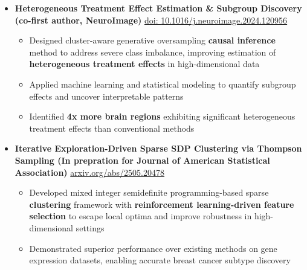 \documentclass[letterpaper,11pt]{article}
\begin{document}
\begin{itemize}[leftmargin=0in, label={}]
\begin{itemize}[leftmargin=0.14in]
\end{itemize}
\vspace{-11.5pt}
\item
\textbf{Heterogeneous Treatment Effect Estimation \& Subgroup Discovery (co-first author, NeuroImage)} \href{https://doi.org/10.1016/j.neuroimage.2024.120956}{doi: \url{10.1016/j.neuroimage.2024.120956}}
\\
\vspace{-5.55pt}
\begin{itemize}[leftmargin=0.14in]
	\item \small
	Designed  cluster-aware generative oversampling \textbf{causal inference} method to address severe class imbalance, improving estimation of \textbf{heterogeneous treatment effects} in high-dimensional data
	\vspace{-1.5pt}
	\item \small %
	Applied machine learning and statistical modeling to quantify subgroup effects and uncover interpretable patterns
	\vspace{-1.5pt}
	\item \small %
	Identified \textbf{4x more brain regions} exhibiting significant heterogeneous treatment effects than conventional methods
\end{itemize}
\vspace{-11.5pt}
\item
\textbf{Iterative Exploration-Driven Sparse SDP Clustering via Thompson Sampling (In prepration for Journal of American Statistical Association)} \href{https://arxiv.org/abs/2505.20478}{arxiv.org/abs/2505.20478}
\\
\vspace{-5.55pt}
\begin{itemize}[leftmargin=0.14in]
	\item \small Developed mixed integer semidefinite programming-based sparse \textbf{clustering} framework with \textbf{reinforcement learning-driven feature selection} to escape local optima and improve robustness in high-dimensional settings
	\vspace{-1.5pt}
	\item \small 
Demonstrated superior performance over existing methods on gene expression datasets, enabling accurate breast cancer subtype discovery

\end{itemize}
\end{itemize}
\end{document}
